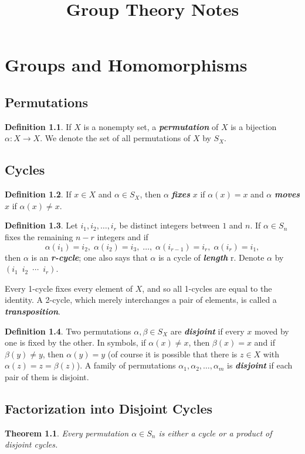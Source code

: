 \documentclass[12pt]{report}
\title{Group Theory Notes}
\newtheorem{theorem}{Theorem}[chapter]
\theoremstyle{definition}
\newtheorem*{definition}{Definition}
\newcommand{\term}[1]{\textbf{\textit{#1}}}
\begin{document}
\chapter{Groups and Homomorphisms}
\section{Permutations}
\begin{definition}
	If $X$ is a nonempty set, a \term{permutation} of $X$ is a bijection $\alpha:X\to X$. We denote the set of all permutations of $X$ by $S_X$.
\end{definition}

\section{Cycles}
\begin{definition}
	If $x\in X$ and $\alpha\in S_X$, then $\alpha$ \term{fixes} $x$ if $\alpha(x)=x$ and $\alpha$ \term{moves} $x$ if $\alpha(x)\neq x$.
\end{definition}

\begin{definition}
	Let $i_1, i_2, \dots, i_r$ be distinct integers between $1$ and $n$. If $\alpha\in S_n$ fixes the remaining $n-r$ integers and if
	\[ \alpha(i_1)=i_2,\;\alpha(i_2)=i_3,\;\dots,\;\alpha(i_{r-1})=i_r,\;\alpha(i_r)=i_1, \]
	then $\alpha$ is an \term{r-cycle}; one also says that $\alpha$ is a cycle of \term{length} r. Denote $\alpha$ by $(i_1\enspace i_2\enspace \cdots \enspace i_r)$.
	\smallskip

	Every 1-cycle fixes every element of $X$, and so all 1-cycles are equal to the identity. A 2-cycle, which merely interchanges a pair of elements, is called a \term{transposition}.
\end{definition}

\begin{definition}
	Two permutations $\alpha, \beta\in S_X$ are \term{disjoint} if every $x$ moved by one is fixed by the other.
	In symbols, if $\alpha(x)\neq x$, then $\beta(x)=x$ and if $\beta(y)\neq y$, then $\alpha(y)=y$
	(of course it is possible that there is $z\in X$ with $\alpha(z)=z=\beta(z)$).
	A family of permutations $\alpha_1,\alpha_2,\dots,\alpha_m$ is \term{disjoint} if each pair of them is disjoint.
\end{definition}

\section{Factorization into Disjoint Cycles}
\begin{theorem}
	Every permutation $\alpha\in S_n$ is either a cycle or a product of disjoint cycles.
\end{theorem}
\end{document}
